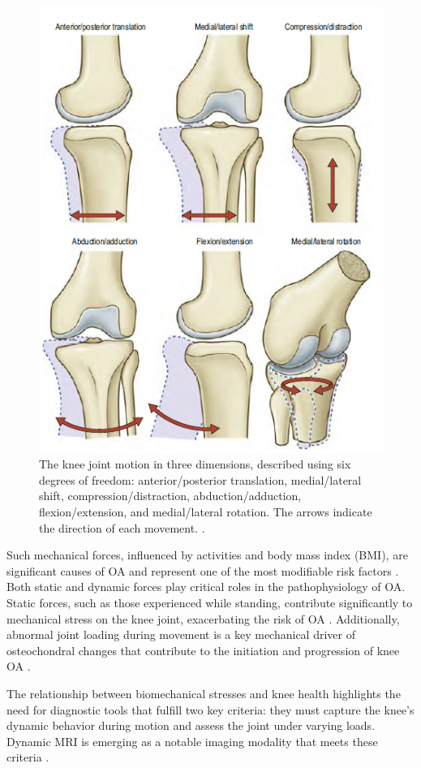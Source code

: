 \documentclass{micro-econ-thesis}
\begin{document}
\begin{figure}[H]
	\centering
	\includegraphics[width=0.7\linewidth]{six_degrees}
	\caption{The knee joint motion in three dimensions, described using six degrees of freedom: anterior/posterior translation, medial/lateral shift, compression/distraction, abduction/adduction, flexion/extension, and medial/lateral rotation. The arrows indicate the direction of each movement. \parencite[p.~1412]{standring_grays_2021}.}
	\label{fig:sixdegrees}
\end{figure}

Such mechanical forces, influenced by activities and body mass index (BMI), are significant causes of OA and represent one of the most modifiable risk factors \parencite{heidari_knee_2011}. Both static and dynamic forces play critical roles in the pathophysiology of OA. Static forces, such as those experienced while standing, contribute significantly to mechanical stress on the knee joint, exacerbating the risk of OA \parencite{egloff_biomechanics_2012}. Additionally, abnormal joint loading during movement is a key mechanical driver of osteochondral changes that contribute to the initiation and progression of knee OA \parencite{coburn_immediate_2023}.


The relationship between biomechanical stresses and knee health highlights the need for diagnostic tools that fulfill two key criteria: they must capture the knee's dynamic behavior during motion and assess the joint under varying loads. Dynamic MRI is emerging as a notable imaging modality that meets these criteria \parencite{conconi_-vivo_2023}. 
\end{document}
